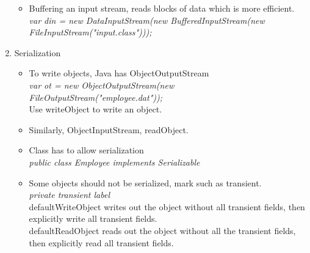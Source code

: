 \documentclass[a4paper]{article}
\begin{document}
\begin{enumerate}
\begin{itemize}
        \item Buffering an input stream, reads blocks of data which is more efficient.\\
        \textit{var din = new DataInputStream(new BufferedInputStream(new FileInputStream("input.class")));}
    \end{itemize}
    \item Serialization
    \begin{itemize}
        \item To write objects, Java has ObjectOutputStream\\
        \textit{var ot = new ObjectOutputStream(new FileOutputStream("employee.dat"));}\\
        Use writeObject to write an object.
        \item Similarly, ObjectInputStream, readObject.
        \item Class has to allow serialization\\
        \textit{public class Employee implements Serializable}
        \item Some objects should not be serialized, mark such as transient.\\
        \textit{private transient label}\\
        defaultWriteObject writes out the object without all transient fields, then explicitly write all transient fields.\\
        defaultReadObject reads out the object without all the transient fields, then explicitly read all transient fields.
    \end{itemize}
\end{enumerate}
\end{document}
